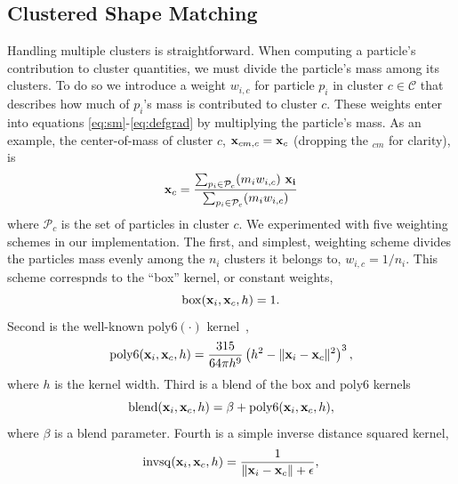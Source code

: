 \documentclass[review]{acmsiggraph}
\begin{document}
\subsection{Clustered Shape Matching}
Handling multiple clusters is straightforward.  When computing a particle's contribution to 
cluster quantities, we must divide the particle's mass among its clusters.  To do 
so we introduce a weight $w_{i,c}$ for particle $p_i$ in cluster $c\in\mathcal{C}$ that describes how much of
$p_i$'s mass is contributed to cluster $c$.  These weights enter into equations \eqref{eq:sm}-\eqref{eq:defgrad} by multiplying
the particle's mass.  As an example, the center-of-mass of cluster $c$, $\mathit{\mathbf{x}}_{cm,c} = \mathit{\mathbf{x}}_{c}$ (dropping the $_{cm}$ for clarity), is
\begin{equation}
\label{eq:com}
\B{x}_{c} = \frac{\sum_{p_i\in\mathcal{P}_c}(m_iw_{i,c})~\B{x_i}}{\sum_{p_i\in\mathcal{P}_c}(m_iw_{i,c})}%
\end{equation}
where $\mathcal{P}_c$ is the set of particles in cluster $c$.
We experimented with five weighting schemes in our implementation.  The first, and simplest, weighting
scheme divides the particles mass evenly among the $n_i$ clusters it belongs to, $w_{i,c} = 1/n_i$.
This scheme correspnds to the ``box'' kernel, or constant weights,
\begin{equation}
\label{eq:box}
\mathrm{box}(\mathit{\mathbf{x}}_i, \mathit{\mathbf{x}}_{c}, h) = 1.
\end{equation}
Second is the well-known $\mathrm{poly6}(\cdot)$ kernel~\cite{Mueller:2003:PFS},
\begin{equation}
\label{eq:poly6}
\mathrm{poly6}(\mathit{\mathbf{x}}_i, \mathit{\mathbf{x}}_{c}, h) = \frac{315}{64\pi h^9}\left(h^2-\|\mathit{\mathbf{x}}_i-\mathit{\mathbf{x}}_{c}\|^2\right)^3,
\end{equation}
where $h$ is the kernel width.
Third is a blend of the $\mathrm{box}$ and $\mathrm{poly6}$ kernels
\begin{equation}
\label{blend}
\mathrm{blend}(\mathit{\mathbf{x}}_i, \mathit{\mathbf{x}}_{c}, h) = \beta + \mathrm{poly6}(\mathit{\mathbf{x}}_i, \mathit{\mathbf{x}}_{c}, h),
\end{equation}
where $\beta$ is a blend parameter.
Fourth is a simple inverse distance squared kernel,
\begin{equation}
\label{eq:invdistancesquared}
\mathrm{invsq}(\mathit{\mathbf{x}}_i, \mathit{\mathbf{x}}_{c}, h) = \frac{1}{\|\mathit{\mathbf{x}}_i-\mathit{\mathbf{x}}_{c}\|+\epsilon},
\end{equation}
\end{document}
